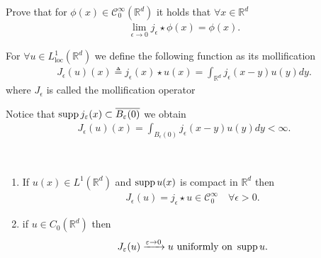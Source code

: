 \begin{exercise}
 Prove that for $\phi(x) \in  \mathcal{C}_0^{\infty}(\mathbb{R}^{d} ) $  it holds that $\forall x \in  \mathbb{R}^{d} $
 \begin{align*}
   \lim_{\epsilon \to 0}j_{\epsilon} \star \phi(x) = \phi(x)
 .\end{align*}
\end{exercise}
\begin{definition}\label{mollification_operator}
  For $\forall u \in  L_{\text{loc}}^{1}(\mathbb{R}^{d} ) $  we define the following function as its mollification 
  \begin{align*}
    J_{\epsilon}(u)(x) \triangleq j_{\epsilon}(x) \star u(x) = \int_{\mathbb{R}^{d} }j_{\epsilon}(x-y)u(y)dy
  .\end{align*}
  where $J_{\epsilon}$ is called the mollification operator
\end{definition}
\begin{remark}
  Notice that $\operatorname*{supp} j_{\varepsilon}(x) \subset  \overline{B_{\varepsilon}(0)} $  we obtain 
  \begin{align*}
    J_{\epsilon}(u)(x) = \int_{B_{\epsilon}(0)}j_{\epsilon}(x-y)u(y) dy < \infty
  .\end{align*}
\end{remark}
\begin{lemma}\hspace{0mm}\\
  \begin{enumerate}
    \item If $u(x) \in  L^{1}(\mathbb{R}^{d} ) $  and $\operatorname*{supp} u(x)$ is compact in $\mathbb{R}^{d} $ then 
      \begin{align*}
        J_{\epsilon}(u) = j_{\epsilon} \star  u \in \mathcal{C}_0^{\infty} \quad \forall  \epsilon > 0
      .\end{align*}
    \item if $u \in  C_0(\mathbb{R}^{d} )$ then 
      \begin{align*}
        J_{\varepsilon}(u) \xrightarrow{\varepsilon \to 0} u \text{ uniformly on } \operatorname*{supp} u
      .\end{align*}
  \end{enumerate}
\end{lemma}
